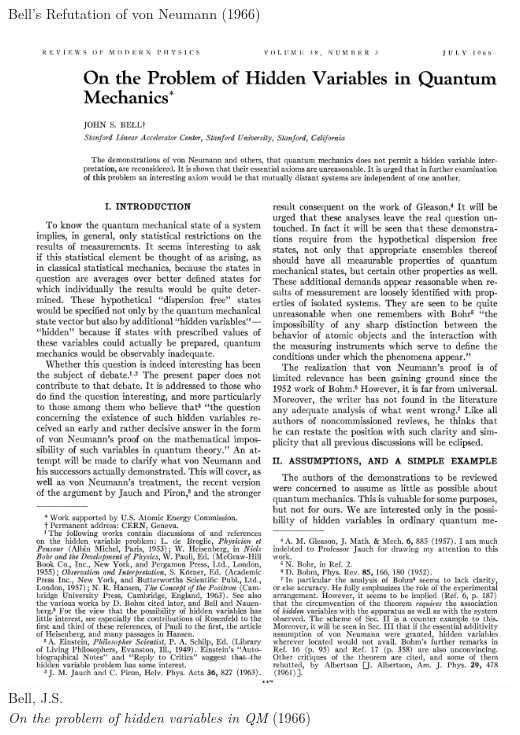 \begin{frame}{Bell’s Refutation of von Neumann (1966)}
\begin{minipage}{0.33\textwidth}
  \includegraphics[width=\textwidth]{figures/bell1966.png} \\
  \vspace{0.2cm}
  {\footnotesize Bell, J.S. \\
  \emph{On the problem of hidden variables in QM} (1966)}
\end{minipage}

\end{frame}




